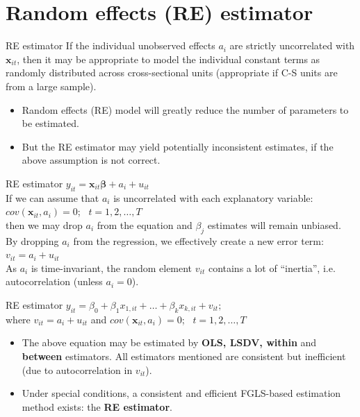 \documentclass[usenames,dvipsnames]{beamer}
\begin{document}
\section{Random effects (RE) estimator}
\begin{frame}{RE estimator}
If the individual unobserved effects $a_i$ are strictly uncorrelated with $\bm{x}_{it}$, then it may be appropriate to model the individual constant terms as randomly distributed across cross-sectional units (appropriate if C-S units are from a large sample).
\bigskip

\begin{itemize}
\item Random effects (RE) model will greatly reduce the number of parameters to be estimated.
\bigskip
\item But the RE estimator may yield potentially inconsistent estimates, if the above assumption is not correct.
\end{itemize}
\end{frame}
\begin{frame}{RE estimator}
$y_{it} = \bm{x}_{it} \bm{\beta} + a_i + u_{it}$\\
\vspace{0.5cm}
If we can assume that $a_i$ is uncorrelated with each explanatory variable: $\textit{cov}(\bm{x}_{it}, a_i) = 0$; \ $t = 1,2, \dots, T$ \\then we may drop $a_i$ from the equation and $\beta_j$ estimates will remain unbiased.\\
\bigskip
By dropping $a_i$ from the regression, we effectively create a new error term: $v_{it} = a_i + u_{it}$\\
\medskip
As $a_i$ is time-invariant, the random element $v_{it}$ contains a lot of ``inertia'', i.e. autocorrelation (unless $a_i = 0$).
\end{frame}
\begin{frame}{RE estimator}
$y_{it} = \beta_0 + \beta_1 x_{1,it} + \dots + \beta_k x_{k,it} + v_{it};$\\
\bigskip
where $v_{it} = a_i + u_{it}$ and $\textit{cov}(\bm{x}_{it},a_i)=0$; \ $t=1,2, \dots, T$\\
\bigskip
\begin{itemize}
\item The above equation may be estimated by \textbf{OLS, LSDV, within} and \textbf{between} estimators. All estimators mentioned are consistent but inefficient (due to autocorrelation in $v_{it}$).\\
\item Under special conditions, a consistent and efficient FGLS-based estimation method exists: the \textbf{RE estimator}.
\end{itemize}
\end{frame}
\end{document}

